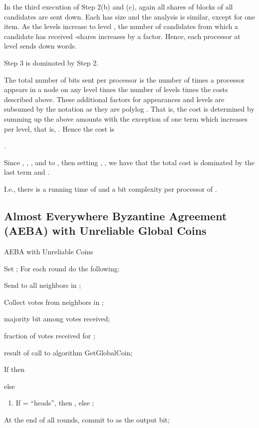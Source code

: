 \documentclass[letterpaper,11pt]{article}
\newcommand{\sq}{\hbox{\rlap{}}}
\newcommand{\qed}{\hspace*{\fill}\sq}
\newenvironment{proof}{\noindent {\bf Proof:}}{\qed\par\vskip 4mm\par}
\begin{document}
\begin{proof}
In the third execution of Step 2(b) and (c), again all shares of  blocks of all  candidates are sent down. Each has size  and the analysis is similar, except for one item. As the levels increase to level , the number of candidates from which a candidate has received -shares
increases by a  factor. Hence, each processor at level  sends down  words. 

Step 3 is dominated by Step 2.

The total number of bits sent per processor is the number of times a processor appears in a node on any level times the number of levels times
the costs described above. These additional factors  for appearances and levels are subsumed by the  notation as they are polylog .
That is, the cost is determined by summing up the above amounts with the exception of one term which increases per level, that is, . Hence the cost is 

 

.

Since , ,  ,   and  to , then setting  , ,   we have that  the total cost is dominated by the last term and .

I.e., there is a running time of  and a bit complexity per processor of
. 
\end{proof}


\subsection{Almost Everywhere Byzantine Agreement (AEBA) with Unreliable Global Coins}\label{AEBACC}

\begin{algorithm}
\caption{AEBA with Unreliable Coins} \label{alg:aebasparse}
Set ; For each round do the following:
\begin{enumerate*}
\item Send  to all neighbors in ;
      \label {step_a}
\item Collect votes from neighbors in ;
      \label {step_b}
\item  majority bit among votes received;
\item  fraction of votes received for ;
\item  result of call to algorithm GetGlobalCoin;
\item If  then 
\item else
\begin{enumerate}
\item If  = ``heads'', then , else ;
\end{enumerate}
\end{enumerate*}

At the end of all rounds, commit to  as the output bit;
\end{algorithm}
\end{document}
